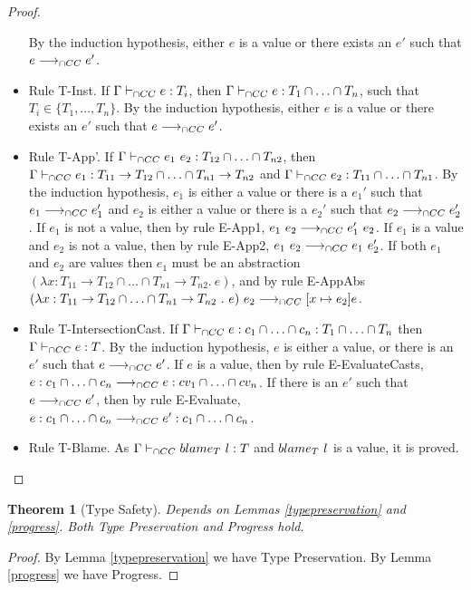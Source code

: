 \documentclass[a4paper]{article}
\newtheorem{theorem}{Theorem}
\begin{document}
\begin{proof}
\begin{itemize}
    By the induction hypothesis, either $e$ is a value or there exists an $e'$ such that $e \longrightarrow_{\cap CC} e'$.
    \item Rule T-Inst.
    If $\Gamma \vdash_{\cap CC} e : T_i$, then $\Gamma \vdash_{\cap CC} e : T_1 \cap \ldots \cap T_n$, such that $T_i \in \{T_1, \ldots, T_n\}$.
    By the induction hypothesis, either $e$ is a value or there exists an $e'$ such that $e \longrightarrow_{\cap CC} e'$.
    \item Rule T-App'.
    If $\Gamma \vdash_{\cap CC} e_1\ e_2 : T_{12} \cap \ldots \cap T_{n2}$, then $\Gamma \vdash_{\cap CC} e_1 : T_{11} \rightarrow T_{12} \cap \ldots \cap T_{n1} \rightarrow T_{n2}$ and $\Gamma \vdash_{\cap CC} e_2 : T_{11} \cap \ldots \cap T_{n1}$.
    By the induction hypothesis, $e_1$ is either a value or there is a $e_1'$ such that $e_1 \longrightarrow_{\cap CC} e_1'$ and $e_2$ is either a value or there is a $e_2'$ such that $e_2 \longrightarrow_{\cap CC} e_2'$.
    If $e_1$ is not a value, then by rule E-App1, $e_1\ e_2 \longrightarrow_{\cap CC} e_1'\ e_2$.
    If $e_1$ is a value and $e_2$ is not a value, then by rule E-App2, $e_1\ e_2 \longrightarrow_{\cap CC} e_1\ e_2'$.
    If both $e_1$ and $e_2$ are values then $e_1$ must be an abstraction $(\lambda x : T_{11} \rightarrow T_{12} \cap \ldots \cap T_{n1} \rightarrow T_{n2} .\ e)$, and by rule E-AppAbs $(\lambda x : T_{11} \rightarrow T_{12} \cap \ldots \cap T_{n1} \rightarrow T_{n2}\ .\ e)\ e_2 \gios [x \mapsto e_2]e$.
    \item Rule T-IntersectionCast.
    If $\Gamma \vdash_{\cap CC} e : c_1 \cap \ldots \cap c_n : T_1 \cap \ldots \cap T_n$ then $\Gamma \vdash_{\cap CC} e : T$.
    By the induction hypothesis, $e$ is either a value, or there is an $e'$ such that $e \longrightarrow_{\cap CC} e'$.
    If $e$ is a value, then by rule E-EvaluateCasts, $e : c_1 \cap \ldots \cap c_n \longrightarrow_{\cap CC} e : cv_1 \cap \ldots \cap cv_n$.
    If there is an $e'$ such that $e \longrightarrow_{\cap CC} e'$, then by rule E-Evaluate, $e : c_1 \cap \ldots \cap c_n \longrightarrow_{\cap CC} e' : c_1 \cap \ldots \cap c_n$.
    \item Rule T-Blame.
    As $\Gamma \vdash_{\cap CC} blame_{T}\ l : T$ and $blame_{T}\ l$ is a value, it is proved.
\end{itemize}
\end{proof}

\begin{theorem}[Type Safety]
\label{typesafety}
Depends on Lemmas \ref{typepreservation} and \ref{progress}.
Both Type Preservation and Progress hold.
\end{theorem}
\begin{proof}
By Lemma \ref{typepreservation} we have Type Preservation.
By Lemma \ref{progress} we have Progress.
\end{proof}
\end{document}
